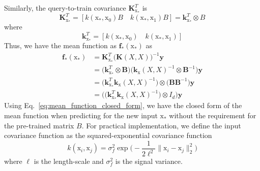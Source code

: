 \documentclass{article}
\begin{document}
Similarly, the query-to-train covariance $\mathbf{K}^{T}_{\mathrm{x}_{*}}$ is
\begin{equation}
    \mathbf{K}^{T}_{\mathrm{x}_{*}} = [  k(\mathrm{x_*}, \mathrm{x}_0)B  \quad k(\mathrm{x}_{*}, \mathrm{x}_{1})B] = \mathbf{k}^{T}_{\mathrm{x}_{*}} \otimes B
\end{equation}
where 
\begin{equation}
   \mathbf{k}^{T}_{\mathrm{x}_{*}} =  [  k(\mathrm{x_*}, \mathrm{x}_0)  \quad k(\mathrm{x}_{*}, \mathrm{x}_{1})]
\end{equation}
Thus, we have the mean function as $\mathbf{f}_{*}(\mathrm{x}_*)$ as 
\begin{align}
    \mathbf{f}_{*}(\mathrm{x}_*) &= \mathbf{K}^{T}_{\mathrm{x}_{*}} \big(\mathbf{K}(X,X) )^{-1} \mathbf{y} \\
    &= \big(\mathbf{k}^{T}_{\mathrm{x}_{*}} \otimes \mathbf{B} \big)\big(\mathbf{k}_{\mathrm{x}}(X,X)^{-1}  \otimes  \mathbf{B}^{-1} \big) \mathbf{y} \\
    &= \Big(\mathbf{k}^{T}_{\mathrm{x}_{*}} \mathbf{k}_{\mathrm{x}}(X,X)^{-1}\Big) \otimes \Big(\mathbf{B}  \mathbf{B}^{-1}\Big) \mathbf{y} \\
    &= \Big( \big(\mathbf{k}^{T}_{\mathrm{x}_{*}} \mathbf{k}_{\mathrm{x}}(X,X)^{-1}\big) \otimes I_{d} \Big)\mathbf{y} \label{eq:mean_function_closed_form}
\end{align}
Using Eq.~\ref{eq:mean_function_closed_form}, we have the closed form of the mean function when predicting for the new input $\mathrm{x}_{*}$ without the requirement for the pre-trained matrix $B$. For practical implementation, we define the input covariance function as the squared-exponential covariance function 
\begin{equation}
    k(\mathrm{x}_i, \mathrm{x}_j) = \sigma^2_{f} \exp\Big( - \frac{1}{2 \ell^2} \| \mathrm{x}_i - \mathrm{x}_j\|^2_2\Big)
\end{equation}
where $\ell$ is the length-scale and $\sigma^2_f$ is the signal variance. 
\end{document}
